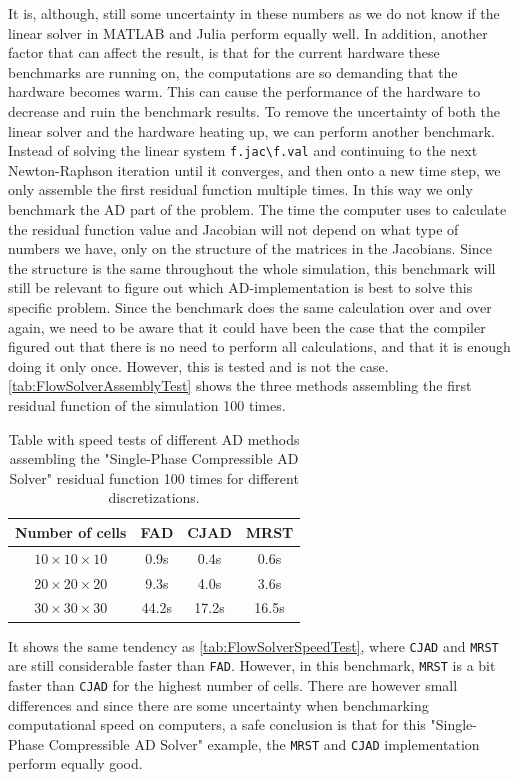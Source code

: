 It is, although, still some uncertainty in these numbers as we do not know if the linear solver in MATLAB and Julia perform equally well. In addition, another factor that can affect the result, is that for the current hardware these benchmarks are running on, the computations are so demanding that the hardware becomes warm. This can cause the performance of the hardware to decrease and ruin the benchmark results. To remove the uncertainty of both the linear solver and the hardware heating up, we can perform another benchmark. Instead of solving the linear system \texttt{f.jac\textbackslash f.val} and continuing to the next Newton-Raphson iteration until it converges, and then onto a new time step, we only assemble the first residual function multiple times. In this way we only benchmark the AD part of the problem. The time the computer uses to calculate the residual function value and Jacobian will not depend on what type of numbers we have, only on the structure of the matrices in the Jacobians. Since the structure is the same throughout the whole simulation, this benchmark will still be relevant to figure out which AD-implementation is best to solve this specific problem. Since the benchmark does the same calculation over and over again, we need to be aware that it could have been the case that the compiler figured out that there is no need to perform all calculations, and that it is enough doing it only once. However, this is tested and is not the case. \autoref{tab:FlowSolverAssemblyTest} shows the three methods assembling the first residual function of the simulation 100 times.
\begin{table}[htb]
    \centering
    \caption{Table with speed tests of different AD methods assembling the "Single-Phase Compressible AD Solver" residual function 100 times for different discretizations.}
    \label{tab:FlowSolverAssemblyTest}
    \def\arraystretch{1.5}
    \begin{tabular}{cccc}
    \textbf{Number of cells} & \textbf{FAD} & \textbf{CJAD} & \textbf{MRST}\\
        \hline
         $10\times10\times10$ & 0.9s & 0.4s & 0.6s  \\  
         $20\times20\times20$ & 9.3s & 4.0s & 3.6s \\ 
         $30\times30\times30$ & 44.2s& 17.2s& 16.5s \\ \hline
    \end{tabular}
\end{table}
It shows the same tendency as \autoref{tab:FlowSolverSpeedTest}, where \texttt{CJAD} and \texttt{MRST} are still considerable faster than \texttt{FAD}. However, in this benchmark, \texttt{MRST} is a bit faster than \texttt{CJAD} for the highest number of cells. There are however small differences and since there are some uncertainty when benchmarking computational speed on computers, a safe conclusion is that for this "Single-Phase Compressible AD Solver" example, the \texttt{MRST} and \texttt{CJAD} implementation perform equally good.